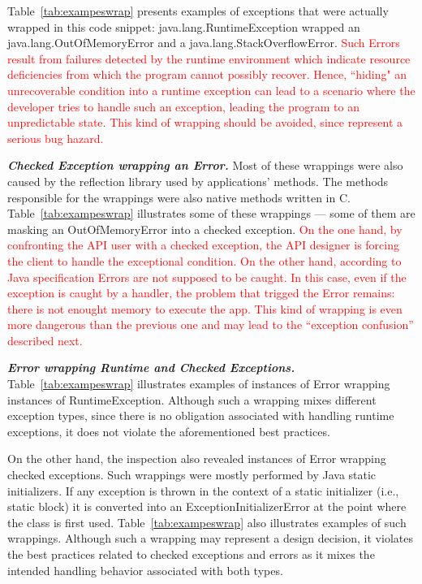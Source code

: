 Table~\ref{tab:exampeswrap} presents examples of exceptions that
were actually wrapped in this code snippet: java.lang.RuntimeException wrapped
an java.lang.OutOfMemoryError and a java.lang.StackOverflowError.
\textcolor{red}{Such Errors result from failures detected by the runtime environment which indicate
resource deficiencies from which the program cannot possibly recover.
Hence, ``hiding" an unrecoverable condition into a runtime exception
can lead to a scenario where the developer tries to handle such an exception, leading the program
to an unpredictable state. This kind of wrapping should be avoided, since represent a
serious bug hazard.}

\bigskip

\emph{\textbf{Checked Exception wrapping an Error.}} Most of these wrappings
 were also caused by the reflection library used by applications' methods. The methods responsible for the wrappings
were also native methods written in C. Table~\ref{tab:exampeswrap} illustrates
some of these wrappings --- some of them are masking an OutOfMemoryError
into a checked exception.
\textcolor{red}{On the one hand, by confronting the API user with a checked exception,
the API designer is forcing the client to handle the exceptional condition.
On the other hand, according to Java specification Errors are not supposed to be
caught. In this case, even if the exception is caught by a handler, the problem 
that trigged the Error remains: there is not enought memory to execute the app.
This kind of wrapping is even more dangerous than the previous one
and may lead to the ``exception confusion'' described next.}

\emph{\textbf{Error wrapping Runtime and Checked Exceptions.}} Table~\ref{tab:exampeswrap}  illustrates
examples of instances of Error wrapping instances of
RuntimeException.
Although such a wrapping mixes different exception types,
since there is no obligation associated with handling runtime exceptions, it
does not violate the aforementioned best practices.

On the other hand, the inspection
also revealed instances of Error wrapping checked exceptions. Such wrappings were
mostly performed by Java static initializers. If any exception is thrown in the context of a static initializer
(i.e., static block)  it is converted into an ExceptionInitializerError
at the point where the class is first used.  Table~\ref{tab:exampeswrap} also illustrates
examples of such wrappings. Although such a wrapping may represent a design decision,
it violates the best practices related to checked exceptions and errors as it mixes the intended handling
behavior associated with both types.

